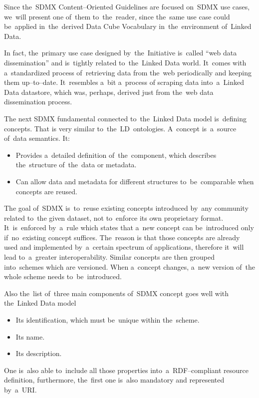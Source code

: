 Since the~SDMX Content--Oriented Guidelines are focused on~SDMX use cases, we~will present
one of~them to~the~reader, since the~same use case could be~applied in~the~derived Data Cube
Vocabulary in~the~environment of~Linked Data.

In fact, the~primary use case designed by~the~Initiative is~called “web data dissemination”
and is~tightly related to~the~Linked Data world. It~comes with a~standardized process of~retrieving
data from the~web periodically and keeping them up--to--date. It~resembles a~bit a~process
of scraping data into~a~Linked Data datastore, which was, perhaps, derived just from the~web
data dissemination process.

The next SDMX fundamental connected to~the~Linked Data model is~defining concepts. That is
very similar to~the~LD~ontologies. A~concept is~a~source of~data semantics. It:

\begin{itemize}
\item Provides a~detailed definition of~the~component, which describes the~structure of~the~data or
metadata.
\item Can allow data and metadata for different structures to~be~comparable when concepts are reused.
\end{itemize}

The goal of~SDMX is~to~reuse existing concepts introduced by~any community related to~the
given dataset, not to~enforce its own proprietary format. It~is~enforced by~a~rule which states
that a~new concept can be~introduced only if~no~existing concept suffices. The~reason
is that those concepts are already used and implemented by~a~certain spectrum of
applications, therefore it~will lead to~a~greater interoperability. Similar concepts are then
grouped into~schemes which are versioned. When a~concept changes, a~new version of~the
whole scheme needs to~be~introduced.

Also the~list of~three main components of~SDMX concept goes well with the~Linked Data model

\begin{itemize}
\item Its identification, which must be~unique within the~scheme.
\item Its name.
\item Its description.
\end{itemize}

One is~also able to~include all those properties into~a~RDF--compliant resource definition,
furthermore, the~first one is~also mandatory and represented by~a~URI.

